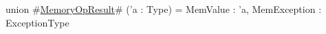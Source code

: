 union #\hyperref[sailRISCVzMemoryOpResult]{MemoryOpResult}# ('a : Type) = {
  MemValue     : 'a,
  MemException : ExceptionType
}

